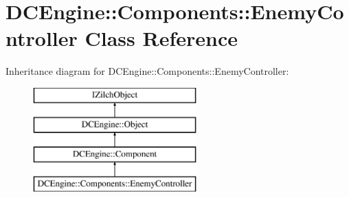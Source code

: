 \hypertarget{classDCEngine_1_1Components_1_1EnemyController}{\section{D\-C\-Engine\-:\-:Components\-:\-:Enemy\-Controller Class Reference}
\label{classDCEngine_1_1Components_1_1EnemyController}
}
Inheritance diagram for D\-C\-Engine\-:\-:Components\-:\-:Enemy\-Controller\-:\begin{figure}[H]
\begin{center}
\leavevmode
\includegraphics[height=4.000000cm]{classDCEngine_1_1Components_1_1EnemyController}
\end{center}
\end{figure}

